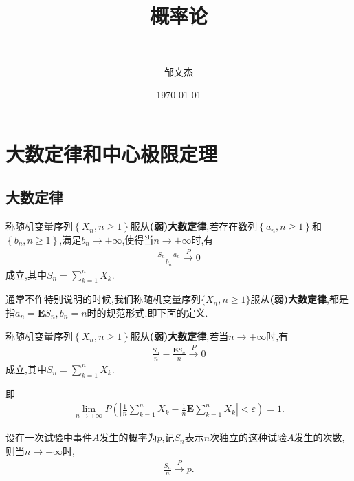 \documentclass[lang=cn,newtx,10pt,scheme=chinese]{../../Template/elegantbook}
\title{概率论}
\subtitle{\,\,}
\author{邹文杰}
\institute{无}
\date{\today}
\begin{document}
\maketitle
\frontmatter

\tableofcontents

\mainmatter%

\chapter{大数定律和中心极限定理}

\section{大数定律}

\begin{definition}[(弱)大数定律]\label{definition:(弱)大数定律}
    称随机变量序列$\left\{ X_n,n\ge 1 \right\} $服从\textbf{(弱)大数定律},若存在数列$\left\{a_n,n\geqslant  1\right\}$和$\left\{b_n,n\geqslant  1\right\}$,满足$b_n \to +\infty$,使得当$n\to +\infty$时,有
    \begin{align*}
        \frac{S_n-a_n}{b_n}\overset{P}{\rightarrow}0
    \end{align*}
    成立,其中$S_n=\sum\limits_{k=1}^n{X_k}$.
\end{definition}
\begin{note}
    通常不作特别说明的时候,我们称随机变量序列$\{X_n,n\geqslant  1\}$服从\textbf{(弱)大数定律},都是指$a_n=\boldsymbol{E}S_n,b_n=n$时的规范形式.即下面的定义.
\end{note}

\begin{definition}[(弱)大数定律的规范形式]\label{definition:(弱)大数定律的规范形式}
    称随机变量序列$\left\{ X_n,n\ge 1 \right\}$服从\textbf{(弱)大数定律},若当$n\to +\infty$时,有
    \begin{align*}
        \frac{S_n}{n}-\frac{\boldsymbol{E}S_n}{n}\overset{P}{\rightarrow}0
    \end{align*}
    成立,其中$S_n=\sum\limits_{k=1}^n{X_k}$.
    
    即
    \begin{align*}
        \underset{n\rightarrow +\infty}{\lim}P\left( \left| \frac{1}{n}\sum_{k=1}^n{X_k}-\frac{1}{n}\boldsymbol{E}\sum_{k=1}^n{X_k} \right|<\varepsilon \right) =1.
    \end{align*}
\end{definition}

\begin{theorem}[Bernoulli大数定律]\label{theorem:Bernoulli大数定律}
    设在一次试验中事件$A$发生的概率为$p$,记$S_n$表示$n$次独立的这种试验$A$发生的次数,则当$n\to +\infty$时,
    \begin{align*}
        \frac{S_n}{n}\overset{P}{\rightarrow}p.
    \end{align*}
\end{theorem}
\end{document}

